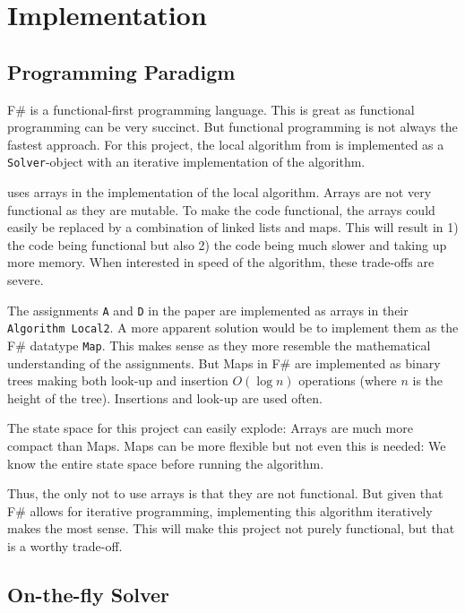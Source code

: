 \chapter{Implementation} %
\label{chpt:implementation}


\section{Programming Paradigm} %
\label{sec:programming-paradigm}

F\# is a functional-first programming language. This is great as functional
programming can be very succinct. But functional programming is not always the
fastest approach. For this project, the local algorithm from \cite{liu1998a} is
implemented as a \texttt{Solver}-object with an iterative implementation of the
algorithm. 

\cite{liu1998a} uses arrays in the implementation of the local algorithm. Arrays
are not very functional as they are mutable. To make the code functional, the
arrays could easily be replaced by a combination of linked lists and maps. This
will result in 1) the code being functional but also 2) the code being much
slower and taking up more memory. When interested in speed of the algorithm,
these trade-offs are severe. 

The assignments \texttt{A} and \texttt{D} in the paper are implemented as arrays
in their \texttt{Algorithm Local2}. A more apparent solution would be to
implement them as the F\# datatype \texttt{Map}. This makes sense as they more
resemble the mathematical understanding of the assignments. But Maps in F\# are
implemented as binary trees making both look-up and insertion $O(\log n)$
operations (where $n$ is the height of the tree). Insertions and look-up are
used often. 


The state space for this project can easily explode: Arrays are much more
compact than Maps. Maps can be more flexible but not even this is needed: We
know the entire state space before running the algorithm. 

Thus, the only not to use arrays is that they are not functional. But given that
F\# allows for iterative programming, implementing this algorithm iteratively
makes the most sense. This will make this project not purely functional, but
that is a worthy trade-off. 

\section{On-the-fly Solver} 


